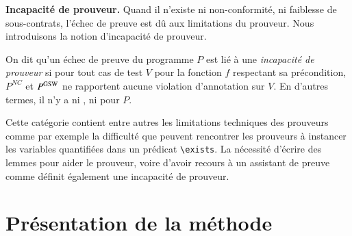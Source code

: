 \textbf{Incapacité de prouveur.}
Quand il n'existe ni non-conformité, ni faiblesse de sous-contrats, l'échec de
preuve est dû aux limitations du prouveur.
Nous introduisons la notion d'incapacité de prouveur.

\begin{definition}
\label{def:prov-incap}
On dit qu'un échec de preuve du programme $P$ est lié à une
\emph{incapacité de prouveur} si pour tout cas de test $V$ pour la fonction $f$
respectant sa précondition, $P^{NC}$ et $P^{\mathrm{GSW}}$ ne rapportent aucune violation
d'annotation sur $V$.
En d'autres termes, il n'y a ni \NCCE, ni \GSWCE pour $P$.
\end{definition}

Cette catégorie contient entre autres les limitations techniques des prouveurs
comme par exemple la difficulté que peuvent rencontrer les prouveurs à
instancer les variables quantifiées dans un prédicat \lstinline'\exists'.
La nécessité d'écrire des lemmes pour aider le prouveur, voire d'avoir recours
à un assistant de preuve comme \coq définit également une incapacité de
prouveur.


\section{Présentation de la méthode}
\label{sec:method-presentation}


